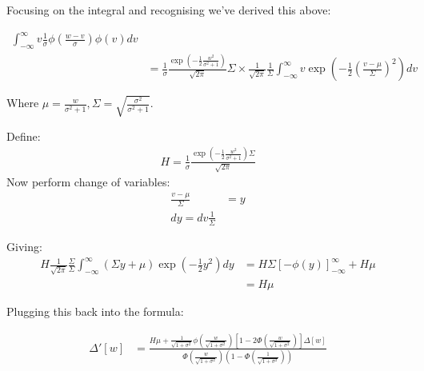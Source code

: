 \documentclass{article}
\begin{document}
Focusing on the integral and recognising we've derived this above:

\begin{align*}
    \int^\infty_{-\infty} v \frac{1}{\sigma}\phi\left(\frac{w - v}{\sigma}\right) \phi(v) dv \\ &=
    \frac{1}{\sigma} \frac{\exp\left(-\frac{1}{2}\frac{w^2}{\sigma^2 + 1}\right)}{
        \sqrt{2\pi}
    }
    \Sigma \times 
    \frac{1}{\sqrt{2\pi}}\frac{1}{\Sigma} \int^\infty_{-\infty}
    v \exp\left(
        -\frac{1}{2}
        \left(\frac{v - \mu}{\Sigma}\right)^2
    \right) dv
\end{align*}

Where $\mu = \frac{w}{\sigma^2 + 1}, \Sigma = \sqrt{\frac{\sigma^2}{\sigma^2 + 1}}$.

Define:
\begin{align*}
    H = \frac{1}{\sigma} \frac{
        \exp\left( 
            -\frac{1}{2}\frac{w^2}{\sigma^2 + 1}
        \right)\Sigma
    }{\sqrt{2\pi}}
\end{align*}
Now perform change of variables:
\begin{align*}
    \frac{v - \mu}{\Sigma} &= y \\
    dy = dv \frac{1}{\Sigma}
\end{align*}

Giving:
\begin{align*}
    H \frac{1}{\sqrt{2\pi}} \frac{\Sigma}{\Sigma} \int^\infty_{-\infty} \left(
        \Sigma y + \mu
    \right)\exp\left(-\frac{1}{2}y^2\right) dy &= 
H\Sigma \left[
    -\phi(y)
\right]^\infty_{-\infty} + H\mu \\
&= H\mu
\end{align*}


Plugging this back into the formula:

\begin{align*}
   \Delta'[w] &= 
   \frac{
    H\mu
    + \frac{1}{\sqrt{1 + \sigma^2}}\phi\left(\frac{w}{\sqrt{1 + \sigma^2}}\right) \left[
        1 - 2 \Phi(\frac{w}{\sqrt{1 + \sigma^2}})
    \right] \Delta[w]
   }{
    \Phi\left(\frac{w}{\sqrt{1 + \sigma^2}}\right)\left(1 - \Phi\left(\frac{1}{\sqrt{1 + \sigma^2}}\right)\right)
   } \\
\end{align*}
\end{document}
